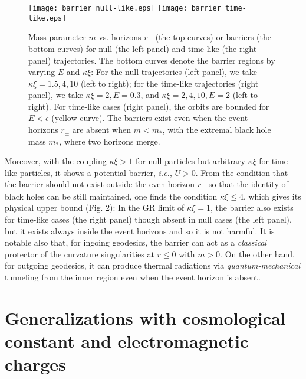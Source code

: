 \documentclass[preprint,aps,tightenlines,showkeys,nofootinbib,superscriptaddress]{revtex4}
\newcommand{\ep}{{\epsilon}}
\newcommand{\ka}{\kappa}
\begin{document}
\begin{figure}
\texttt{[image: barrier\_null-like.eps]}
\qquad
\texttt{[image: barrier\_time-like.eps]}
\caption{Mass parameter $m$ vs. horizons $r_{\pm}$ (the top curves) or barriers (the bottom curves) for null (the left panel) and time-like (the right panel) trajectories. The bottom curves denote the barrier regions by varying $E$ and $\ka\xi$: For the null trajectories (left panel), we take $\ka\xi=1.5,4,10$ (left to right); for the time-like trajectories (right panel), we take $\ka\xi=2, E=0.3$, and $\ka\xi=2,4,10, E=2$ (left to right). For time-like cases (right panel), the orbits are bounded for $E<\ep$ (yellow curve). The barriers exist even when the event horizons $r_{\pm}$ are absent when $m<m_*$, with the extremal black hole mass $m_*$, where two horizons merge.}
\label{fig:barrier}
\end{figure}

Moreover, with the coupling $\ka \xi > 1$ for null particles but arbitrary $\ka \xi$ for time-like particles, it
shows a potential barrier, {\it i.e.}, $U > 0$. From the condition that the barrier should not exist outside the even horizon $r_+$ so that the identity of black holes can be still maintained, one finds the condition $\ka \xi \leq 4$, which gives its physical upper bound (Fig. 2): In the GR limit of $\ka \xi = 1$, the barrier also exists for time-like cases (the right panel) though absent in null cases (the left panel), but it exists always inside the event horizons and so it is not harmful. It is notable also that, for ingoing geodesics, the barrier can act as a {\it classical} protector of the curvature singularities at $r \leq 0$ with $m>0$. On the other hand,
for outgoing geodesics, it can produce thermal radiations via {\it quantum-mechanical} tunneling from the inner region even when the event horizon is absent.

\section{Generalizations with cosmological constant and electromagnetic charges}
\end{document}
